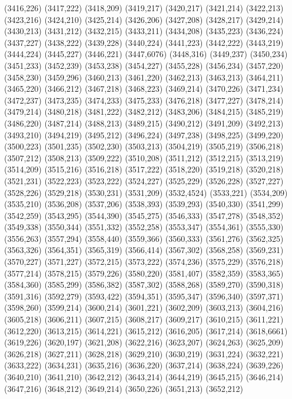 (3416,226)
(3417,222)
(3418,209)
(3419,217)
(3420,217)
(3421,214)
(3422,213)
(3423,216)
(3424,210)
(3425,214)
(3426,206)
(3427,208)
(3428,217)
(3429,214)
(3430,213)
(3431,212)
(3432,215)
(3433,211)
(3434,208)
(3435,223)
(3436,224)
(3437,227)
(3438,222)
(3439,228)
(3440,224)
(3441,223)
(3442,222)
(3443,219)
(3444,224)
(3445,227)
(3446,221)
(3447,6076)
(3448,316)
(3449,237)
(3450,234)
(3451,233)
(3452,239)
(3453,238)
(3454,227)
(3455,228)
(3456,234)
(3457,220)
(3458,230)
(3459,296)
(3460,213)
(3461,220)
(3462,213)
(3463,213)
(3464,211)
(3465,220)
(3466,212)
(3467,218)
(3468,223)
(3469,214)
(3470,226)
(3471,234)
(3472,237)
(3473,235)
(3474,233)
(3475,233)
(3476,218)
(3477,227)
(3478,214)
(3479,214)
(3480,218)
(3481,222)
(3482,212)
(3483,206)
(3484,215)
(3485,219)
(3486,220)
(3487,214)
(3488,213)
(3489,215)
(3490,212)
(3491,209)
(3492,213)
(3493,210)
(3494,219)
(3495,212)
(3496,224)
(3497,238)
(3498,225)
(3499,220)
(3500,223)
(3501,235)
(3502,230)
(3503,213)
(3504,219)
(3505,219)
(3506,218)
(3507,212)
(3508,213)
(3509,222)
(3510,208)
(3511,212)
(3512,215)
(3513,219)
(3514,209)
(3515,216)
(3516,218)
(3517,222)
(3518,220)
(3519,218)
(3520,218)
(3521,231)
(3522,223)
(3523,222)
(3524,227)
(3525,229)
(3526,228)
(3527,227)
(3528,226)
(3529,218)
(3530,231)
(3531,209)
(3532,4524)
(3533,221)
(3534,209)
(3535,210)
(3536,208)
(3537,206)
(3538,393)
(3539,293)
(3540,330)
(3541,299)
(3542,259)
(3543,295)
(3544,390)
(3545,275)
(3546,333)
(3547,278)
(3548,352)
(3549,338)
(3550,344)
(3551,332)
(3552,258)
(3553,347)
(3554,361)
(3555,330)
(3556,263)
(3557,294)
(3558,440)
(3559,366)
(3560,333)
(3561,276)
(3562,325)
(3563,326)
(3564,351)
(3565,319)
(3566,414)
(3567,302)
(3568,258)
(3569,231)
(3570,227)
(3571,227)
(3572,215)
(3573,222)
(3574,236)
(3575,229)
(3576,218)
(3577,214)
(3578,215)
(3579,226)
(3580,220)
(3581,407)
(3582,359)
(3583,365)
(3584,360)
(3585,299)
(3586,382)
(3587,302)
(3588,268)
(3589,270)
(3590,318)
(3591,316)
(3592,279)
(3593,422)
(3594,351)
(3595,347)
(3596,340)
(3597,371)
(3598,260)
(3599,214)
(3600,214)
(3601,221)
(3602,209)
(3603,213)
(3604,216)
(3605,218)
(3606,211)
(3607,215)
(3608,217)
(3609,217)
(3610,215)
(3611,221)
(3612,220)
(3613,215)
(3614,221)
(3615,212)
(3616,205)
(3617,214)
(3618,6661)
(3619,226)
(3620,197)
(3621,208)
(3622,216)
(3623,207)
(3624,263)
(3625,209)
(3626,218)
(3627,211)
(3628,218)
(3629,210)
(3630,219)
(3631,224)
(3632,221)
(3633,222)
(3634,231)
(3635,216)
(3636,220)
(3637,214)
(3638,224)
(3639,226)
(3640,210)
(3641,210)
(3642,212)
(3643,214)
(3644,219)
(3645,215)
(3646,214)
(3647,216)
(3648,212)
(3649,214)
(3650,226)
(3651,213)
(3652,212)
